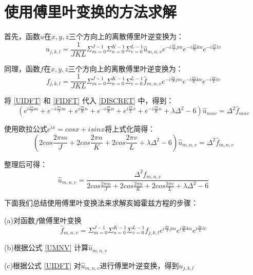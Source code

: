 \section{使用傅里叶变换的方法求解}
首先，函数$u$在$x,y,z$三个方向上的离散傅里叶逆变换为：
\begin{equation} \label{UIDFT}
u_{j,k,l}=\frac{1}{JKL}\Sigma_{m=0}^{J-1}\Sigma_{n=0}^{K-1}\Sigma_{v=0}^{L-1}
\hat{u}_{m,n,v}e^{-i\frac{2\pi}{J}jm}e^{-i\frac{2\pi}{K}kn}e^{-i\frac{2\pi}{L}lv}
\end{equation}  

同理，函数$f$在$x,y,z$三个方向上的离散傅里叶逆变换为：
\begin{equation} \label{FIDFT}
f_{j,k,l}=\frac{1}{JKL}\Sigma_{m=0}^{J-1}\Sigma_{n=0}^{K-1}\Sigma_{v=0}^{L-1}
\hat{f}_{m,n,v}e^{-i\frac{2\pi}{J}jm}e^{-i\frac{2\pi}{K}kn}e^{-i\frac{2\pi}{L}lv}
\end{equation}

将 \eqref{UIDFT} 和 \eqref{FIDFT} 代入 \eqref{DISCRET} 中，得到：
\begin{equation}
(e^{i\frac{2\pi}{J}m} +e^{-i\frac{2\pi}{J}m}+
e^{i\frac{2\pi}{K}n} +e^{-i\frac{2\pi}{K}n}+
e^{i\frac{2\pi}{L}v} +e^{-i\frac{2\pi}{K}n}+ \lambda \Delta^2 - 6)
\hat{u}_{mnv} = \Delta^2 \hat{f}_{mnv}
\end{equation}  

使用欧拉公式$e^{ix} = cosx + isinx$将上式化简得：
\begin{equation}
(2cos\frac{2\pi m}{J}+2cos\frac{2\pi n}{K}+2cos\frac{2\pi v}{L} + \lambda \Delta^2 - 6)
\hat{u}_{m,n,v} = \Delta^2 \hat{f}_{m,n,v}
\end{equation}  

整理后可得：
\begin{equation} \label{UMNV}
\hat{u}_{m,n,v}= \frac{\Delta^2 \hat{f}_{m,n,v}}
{2cos\frac{2\pi m}{J}+2cos\frac{2\pi n}{K}+2cos\frac{2\pi v}{L} + \lambda \Delta^2 - 6}
\end{equation}  

下面我们总结使用傅里叶变换法来求解亥姆霍兹方程的步骤：  

(a)对函数$f$做傅里叶变换
\begin{equation}
\hat{f}_{m,n,v}=\Sigma_{m=0}^{J-1}\Sigma_{n=0}^{K-1}\Sigma_{v=0}^{L-1}
f_{j,k,l}e^{i\frac{2\pi}{J}jm}e^{i\frac{2\pi}{K}kn}e^{i\frac{2\pi}{L}lv}
\end{equation}  

(b)根据公式 \eqref{UMNV}  计算$\hat{u}_{m,n,v}$  

(c)根据公式 \eqref{UIDFT} 对$\hat{u}_{m,n,v}$进行傅里叶逆变换，得到$u_{j,k,l}$

